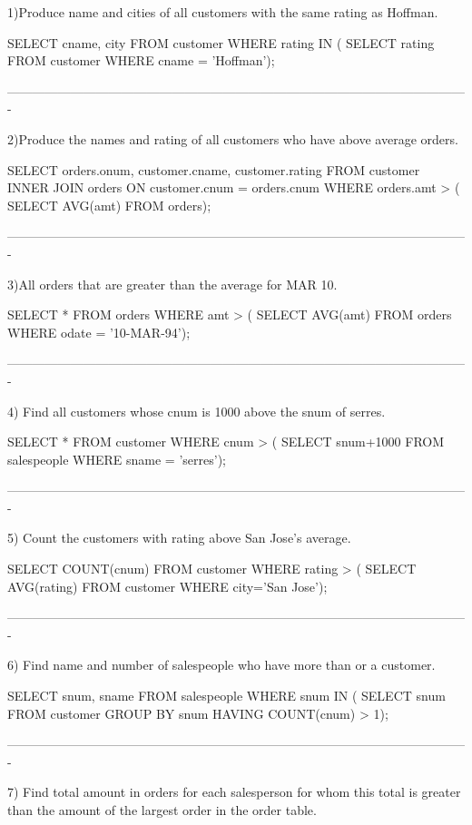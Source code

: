 1)Produce name and cities of all customers with the same rating as Hoffman.

SELECT cname, city FROM customer WHERE rating IN (
SELECT rating FROM customer WHERE cname = 'Hoffman');

-------------------------------------------------------------------------------------------------------------

2)Produce the names and rating of all customers who have above average orders.

SELECT orders.onum, customer.cname, customer.rating
FROM customer
INNER JOIN orders
ON customer.cnum = orders.cnum 
WHERE orders.amt > (																
SELECT AVG(amt) FROM orders);


-------------------------------------------------------------------------------------------------------------

3)All orders that are greater than the average for MAR 10.

SELECT * FROM orders WHERE amt > (
SELECT AVG(amt) FROM orders WHERE odate = '10-MAR-94');


-------------------------------------------------------------------------------------------------------------

4)  Find all customers whose cnum is 1000 above the snum of serres.

SELECT * FROM customer WHERE cnum > (
SELECT snum+1000 FROM salespeople WHERE sname = 'serres');


-------------------------------------------------------------------------------------------------------------

5) Count the customers with rating above San Jose’s average.

SELECT COUNT(cnum) FROM customer WHERE rating > (
SELECT AVG(rating) FROM customer WHERE city='San Jose');

-------------------------------------------------------------------------------------------------------------

6)  Find name and number of salespeople who have more than or a customer.

SELECT snum, sname FROM salespeople WHERE snum IN (
SELECT snum FROM customer
GROUP BY snum
HAVING COUNT(cnum) > 1);


-------------------------------------------------------------------------------------------------------------

7) Find total amount in orders for each salesperson for whom this total is greater than the amount of the   largest order in the order table.

